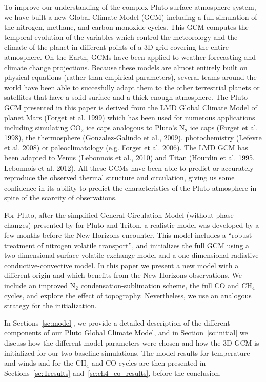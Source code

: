 To improve our understanding of the complex Pluto surface-atmosphere system,
we have built a new Global Climate Model (GCM) including a full simulation
of the nitrogen, methane, and carbon monoxide cycles. 
This GCM computes the temporal evolution of the variables which control 
the meteorology and the climate of the planet in different points of a 3D grid
covering the entire atmosphere. On the Earth, GCMs have been applied to weather
forecasting and climate change projections.
Because these models are almost entirely built on
physical equations (rather than empirical parameters),
several teams around the world have been able to succesfully adapt them
to the other terrestrial planets or satellites that have a
solid surface and a thick enough atmosphere. The Pluto GCM presented
in this paper is derived from the LMD Global Climate Model of planet Mars (Forget
et al. 1999) which has been used for numerous applications including simulating CO$_2$
ice caps analogous to Pluto's N$_2$ ice caps (Forget et al. 1998),
the thermosphere (Gonzalez-Galindo et al., 2009), photochemistry
(Lefevre et al. 2008) or paleoclimatology (e.g. Forget et al. 2006).
The LMD GCM has been
adapted to Venus (Lebonnois et al., 2010)
and Titan (Hourdin et al. 1995, Lebonnois et al. 2012).
All these GCMs have been able to predict or accurately reproduce the
observed thermal structure and circulation, giving us some confidence in its
ability to predict the characteristics of the Pluto atmosphere in spite of the scarcity of
observations.
\nocite{Lebo:10,Hour:95,Lebo:12,Forg:06,Forg:99,Forg:98,Gonz:09a}

For Pluto, after the simplified General Circulation Model (without phase changes) 
presented by \cite{Zalu:13} for Pluto and Triton, a realistic model was developed
by \cite{Toig:15} a few months before the New Horizons encounter. This model includes a
``robust treatment of nitrogen volatile transport'', and initializes
the full GCM using a two dimensional surface volatile exchange model and a 
one-dimensional radiative-conductive-convective model. 
In this paper we present a new model with a different origin and which benefits 
from the New Horizons observations. We include 
an improved N$_2$ condensation-sublimation scheme, the full CO and CH$_4$ cycles, and 
explore the effect of topography.  Nevertheless, we use an analogous strategy
for the initialization. 

In Sections~\ref{sc:model}, we  provide a detailed description of the different components of
our Pluto Global Climate Model, and in Section~\ref{sc:initial} we discuss how the
different model parameters were chosen and how the 3D GCM is initialized for our two
baseline simulations. The model results for temperature and winds and for the CH$_4$ and
CO cycles are then presented in Sections~\ref{sc:Tresults} and~\ref{sc:ch4_co_results},
before the conclusion. 


